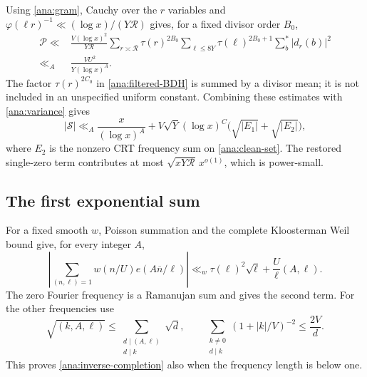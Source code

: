 Using \eqref{ana:gram}, Cauchy over the $r$ variables and
$\varphi(\ell r)^{-1}\ll(\log x)/(Y\mathcal R)$ gives, for a fixed
divisor order $B_0$,
\begin{align*}
 \mathcal P\ll{}&\frac{V(\log x)^2}{Y\mathcal R}
  \sum_{r\asymp\mathcal R}\tau(r)^{2B_0}
  \sum_{\ell\le8Y}\tau(\ell)^{2B_0+1}\sum_b^*|d_r(b)|^2\\
 \ll_A{}&\frac{VU^2}{Y(\log x)^A}.
\end{align*}
The factor $\tau(r)^{2C_0}$ in \eqref{ana:filtered-BDH} is summed by a
divisor mean; it is not included in an unspecified uniform constant.
Combining these estimates with \eqref{ana:variance} gives
\begin{equation}
 |\mathcal S|\ll_A\frac{x}{(\log x)^A}
  +V\sqrt Y(\log x)^C\bigl(\sqrt{|E_1|}+\sqrt{|E_2|}\bigr),
 \label{ana:dispersion-bound}
\end{equation}
where $E_2$ is the nonzero CRT frequency sum on
\eqref{ana:clean-set}. The restored single-zero term contributes at
most $\sqrt{xY\mathcal R}\,x^{o(1)}$, which is power-small.

\subsection{The first exponential sum}

For a fixed smooth $w$, Poisson summation and the complete Kloosterman
Weil bound give, for every integer $A$,
\begin{equation}
 \left|\sum_{(n,\ell)=1}w(n/U)e(A\overline n/\ell)\right|
 \ll_w \tau(\ell)^2\sqrt{\ell}+\frac U{\ell}(A,\ell).
 \label{ana:inverse-completion}
\end{equation}
The zero Fourier frequency is a Ramanujan sum and gives the second
term. For the other frequencies use
\[
 \sqrt{(k,A,\ell)}\le\sum_{\substack{d\mid(A,\ell)\\d\mid k}}\sqrt d,
 \qquad
 \sum_{\substack{k\ne0\\d\mid k}}(1+|k|/V)^{-2}\le\frac{2V}{d}.
\]
This proves \eqref{ana:inverse-completion} also when the frequency
length is below one.

